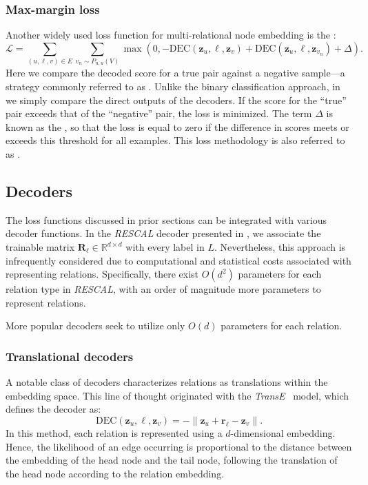 \subsubsection{Max-margin loss}
Another widely used loss function for multi-relational node embedding is the :
\begin{equation}\label{eq:marginLoss}
    \mathcal{L} = \sum_{(u,\ell,v)\in E} \sum_{v_n\sim P_{n,u}(V)} \max(0, -\text{DEC}(\mathbf{z}_u, \ell, \mathbf{z}_v) + \text{DEC}(\mathbf{z}_u, \ell, \mathbf{z}_{v_n}) + \Delta).
\end{equation}
Here we compare the decoded score for a true pair against a negative sample—a strategy commonly referred to as . Unlike the binary classification approach, in  we  simply compare the direct outputs of the decoders. If the score for the ``true'' pair exceeds that of the ``negative'' pair, the loss is minimized. The term $ \Delta $ is known as the , so that the loss is equal to zero if the difference in scores meets or exceeds this threshold for all examples. This loss methodology is also referred to as .

\subsection{Decoders}
The loss functions discussed in prior sections can be integrated with various decoder functions. In the \textit{RESCAL} decoder presented in , we associate the trainable matrix $ \mathbf{R}_\ell\in\mathbb{R}^{d\times d} $ with every label in $ L $. Nevertheless, this approach is infrequently considered due to computational and statistical costs associated with representing relations. Specifically, there exist $ O(d^2) $ parameters for each relation type in \textit{RESCAL}, with an order of magnitude more parameters to represent relations.

More popular decoders seek to utilize only $ O(d) $ parameters for each relation. 

\subsubsection{Translational decoders}
A notable class of decoders characterizes relations as translations within the embedding space. This line of thought originated with the \textit{TransE}~\cite{Bordes2013TransE} model, which defines the decoder as:
\begin{equation*}
    \text{DEC}(\mathbf{z}_u, \ell, \mathbf{z}_v) = -\|\mathbf{z}_u + \mathbf{r}_\ell - \mathbf{z}_v\|.
\end{equation*}
In this method, each relation is represented using a $ d $-dimensional embedding. Hence, the likelihood of an edge occurring is proportional to the distance between the embedding of the head node and the tail node, following the translation of the head node according to the relation embedding.

